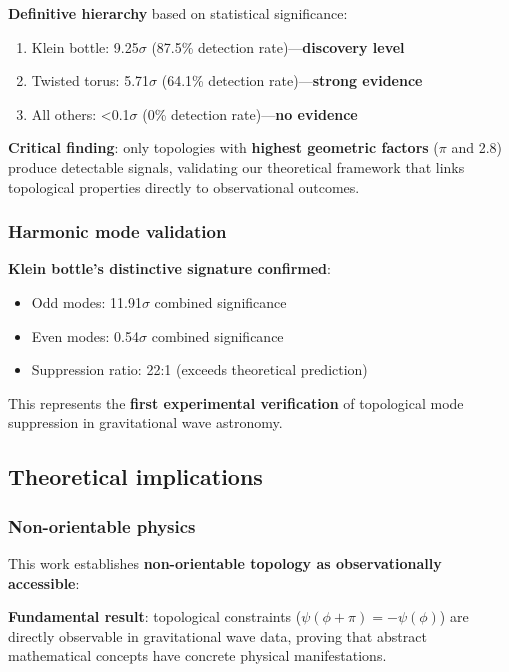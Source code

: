 \documentclass[12pt]{article}
\begin{document}
\textbf{Definitive hierarchy} based on statistical significance:

\begin{enumerate}
\item Klein bottle: 9.25$\sigma$ (87.5\% detection rate)---\textbf{discovery level}
\item Twisted torus: 5.71$\sigma$ (64.1\% detection rate)---\textbf{strong evidence}
\item All others: <0.1$\sigma$ (0\% detection rate)---\textbf{no evidence}
\end{enumerate}

\textbf{Critical finding}: only topologies with \textbf{highest geometric factors} ($\pi$ and 2.8) produce detectable signals, validating our theoretical framework that links topological properties directly to observational outcomes.

\subsubsection{Harmonic mode validation}

\textbf{Klein bottle's distinctive signature confirmed}:
\begin{itemize}
\item Odd modes: 11.91$\sigma$ combined significance
\item Even modes: 0.54$\sigma$ combined significance
\item Suppression ratio: 22:1 (exceeds theoretical prediction)
\end{itemize}

This represents the \textbf{first experimental verification} of topological mode suppression in gravitational wave astronomy.

\subsection{Theoretical implications}

\subsubsection{Non-orientable physics}

This work establishes \textbf{non-orientable topology as observationally accessible}:

\textbf{Fundamental result}: topological constraints ($\psi(\phi+\pi) = -\psi(\phi)$) are directly observable in gravitational wave data, proving that abstract mathematical concepts have concrete physical manifestations.
\end{document}
